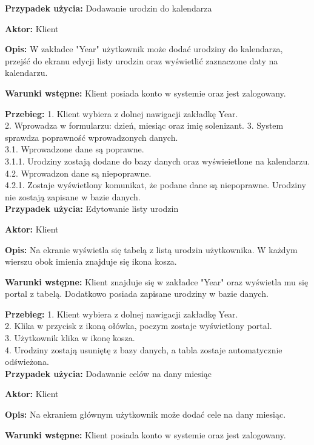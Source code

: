 \textbf{Przypadek użycia:} Dodawanie urodzin do kalendarza

\textbf{Aktor:} Klient

\textbf{Opis:} W zakładce "Year" użytkownik może dodać urodziny do kalendarza, przejść do ekranu edycji listy urodzin oraz wyświetlić zaznaczone daty na kalendarzu. 

\textbf{Warunki wstępne:} Klient posiada konto w systemie oraz jest zalogowany.

\textbf{Przebieg:} 
1. Klient wybiera z dolnej nawigacji zakładkę Year.\\
2. Wprowadza w formularzu: dzień, miesiąc oraz imię solenizant.
3. System sprawdza poprawność wprowadzonych danych. \\
3.1. Wprowadzone dane są poprawne. \\
3.1.1. Urodziny zostają dodane do bazy danych oraz wyświeietlone na kalendarzu. \\
4.2. Wprowadzon dane są niepoprawne.\\
4.2.1. Zostaje wyświetlony komunikat, że podane dane są niepoprawne. Urodziny nie zostają zapisane w bazie danych. \\

\textbf{Przypadek użycia:} Edytowanie listy urodzin

\textbf{Aktor:} Klient

\textbf{Opis:} Na ekranie wyświetla się tabelą z listą urodzin użytkownika. W każdym wierszu obok imienia znajduje się ikona kosza.

\textbf{Warunki wstępne:} Klient znajduje się w zakładce "Year" oraz wyświetla mu się portal z tabelą. Dodatkowo posiada zapisane urodziny w bazie danych.

\textbf{Przebieg:} 
1. Klient wybiera z dolnej nawigacji zakładkę Year.\\
2. Klika w przycisk z ikoną ołówka, poczym zostaje wyświetlony portal.\\
3. Użytkownik klika w ikonę kosza. \\
4. Urodziny zostają usuniętę z bazy danych, a tabla zostaje automatycznie odświeżona.\\

\textbf{Przypadek użycia:} Dodawanie celów na dany miesiąc

\textbf{Aktor:} Klient

\textbf{Opis:} Na ekraniem głównym użytkownik może dodać cele na dany miesiąc.

\textbf{Warunki wstępne:} Klient posiada konto w systemie oraz jest zalogowany.

